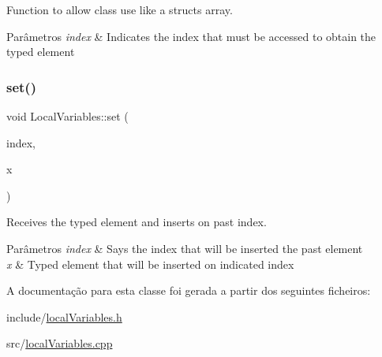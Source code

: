 Function to allow class use like a struct\textquotesingle{}s array. 


\begin{DoxyParams}{Parâmetros}
{\em index} & Indicates the index that must be accessed to obtain the typed element \\
\hline
\end{DoxyParams}
\mbox{\label{classLocalVariables_ac48ae40b67afb74083ebb1163477a1a6}} 
\subsubsection{\texorpdfstring{set()}{set()}}
{\footnotesize\ttfamily void Local\+Variables\+::set (\begin{DoxyParamCaption}\item[{int}]{index,  }\item[{\hyperlink{structtypedElement__s}{typed\+Element}}]{x }\end{DoxyParamCaption})}



Receives the typed element and inserts on past index. 


\begin{DoxyParams}{Parâmetros}
{\em index} & Says the index that will be inserted the past element \\
\hline
{\em x} & Typed element that will be inserted on indicated index \\
\hline
\end{DoxyParams}


A documentação para esta classe foi gerada a partir dos seguintes ficheiros\+:\begin{DoxyCompactItemize}
\item 
include/\hyperlink{localVariables_8h}{local\+Variables.\+h}\item 
src/\hyperlink{localVariables_8cpp}{local\+Variables.\+cpp}\end{DoxyCompactItemize}
